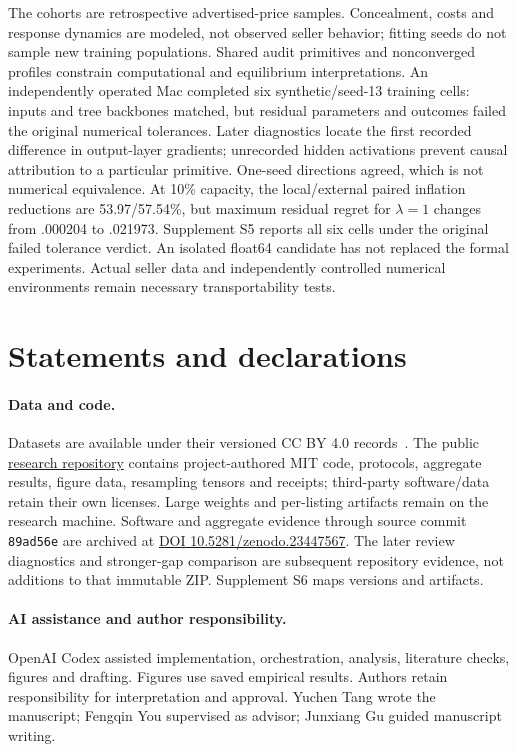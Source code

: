 \documentclass[11pt]{article}
\begin{document}
The cohorts are retrospective advertised-price samples. Concealment, costs
and response dynamics are modeled, not observed seller behavior; fitting
seeds do not sample new training populations. Shared audit primitives and
nonconverged profiles constrain computational and equilibrium interpretations.
An independently operated Mac completed six synthetic/seed-13 training cells:
inputs and tree backbones matched, but residual parameters and outcomes failed
the original numerical tolerances. Later diagnostics locate the first recorded
difference in output-layer gradients; unrecorded hidden activations prevent
causal attribution to a particular primitive. One-seed directions agreed,
which is not numerical equivalence. At 10\% capacity, the local/external paired inflation reductions are 53.97/57.54\%, but maximum residual regret for $\lambda=1$ changes from .000204 to .021973. Supplement S5 reports all six cells under the original failed tolerance verdict. An isolated float64 candidate has not
replaced the formal experiments. Actual seller data and independently
controlled numerical environments remain necessary transportability tests.

\section*{Statements and declarations}
\paragraph{Data and code.}
Datasets are available under their versioned CC BY 4.0 records~\cite{jucarsdata,mucarsdata}.
The public \href{https://github.com/T0Q0R/secondhand-valuation-research}{research repository}
contains project-authored MIT code, protocols, aggregate results, figure data,
resampling tensors and receipts; third-party software/data retain their own
licenses. Large weights and per-listing artifacts remain on the research
machine. Software and aggregate evidence through source commit \texttt{89ad56e} are archived at
\href{https://doi.org/10.5281/zenodo.23447567}{DOI 10.5281/zenodo.23447567}.
The later review diagnostics and stronger-gap comparison are subsequent repository evidence, not additions to that immutable ZIP. Supplement S6 maps versions and artifacts.

\paragraph{AI assistance and author responsibility.}
OpenAI Codex assisted implementation, orchestration, analysis, literature
checks, figures and drafting. Figures use saved empirical results. Authors
retain responsibility for interpretation and approval. Yuchen Tang wrote the
manuscript; Fengqin You supervised as advisor; Junxiang Gu guided manuscript writing.
\end{document}
